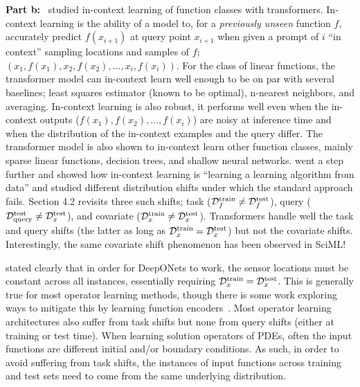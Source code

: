 {\bf Part b:}~\citep{garg2022can} studied in-context learning of function classes with transformers. In-context learning is the ability of a model to, for a {\it previously unseen} function $f$, accurately predict $f(x_{i+1})$ at query point $x_{i+1}$ when given a prompt of $i$ ``in context'' sampling locations and samples of $f$; $\left(x_1, f(x_1), x_2, f(x_2), \dots, x_i, f(x_i) \right)$. For the class of linear functions, the transformer model can in-context learn well enough to be on par with several baselines; least squares estimator (known to be optimal), n-nearest neighbors, and averaging. In-context learning is also robust, it performs well even when the in-context outputs ($f(x_1), f(x_2), \dots, f(x_i)$) are noisy at inference time and when the distribution of the in-context examples and the query differ. The transformer model is also shown to in-context learn other function classes, mainly sparse linear functions, decision trees, and shallow neural networks. \citep{zhang2024trained} went a step further and showed how in-context learning is ``learning a learning algorithm from data'' and studied different distribution shifts under which the standard approach fails. Section 4.2 revisits three such shifts; task ($\mathcal{D}_{f}^{\text{train}} \neq \mathcal{D}_{f}^{\text{test}}$), query ($\mathcal{D}_{\text{query}}^{\text{test}} \neq \mathcal{D}_{x}^{\text{test}}$), and covariate ($\mathcal{D}_{x}^{\text{train}} \neq \mathcal{D}_{x}^{\text{test}}$). Transformers handle well the task and query shifts (the latter as long as $\mathcal{D}_{x}^{\text{train}} = \mathcal{D}_{x}^{\text{test}}$) but not the covariate shifts. Interestingly, the same covariate shift phenomenon has been observed in SciML!

\citep{lu2019deeponet} stated clearly that in order for DeepONets to work, the sensor locations must be constant across all instances, essentially requiring $\mathcal{D}_{x}^{\text{train}} = \mathcal{D}_{x}^{\text{test}}$. This is generally true for most operator learning methods, though there is some work exploring ways to mitigate this by learning function encoders~\citep{ingebrand2025basis, zhang2023belnet}. Most operator learning architectures also suffer from task shifts but none from query shifts (either at training or test time). When learning solution operators of PDEs, often the input functions are different initial and/or boundary conditions. As such, in order to avoid suffering from task shifts, the instances of input functions across training and test sets need to come from the same underlying distribution.
%
\pagebreak
